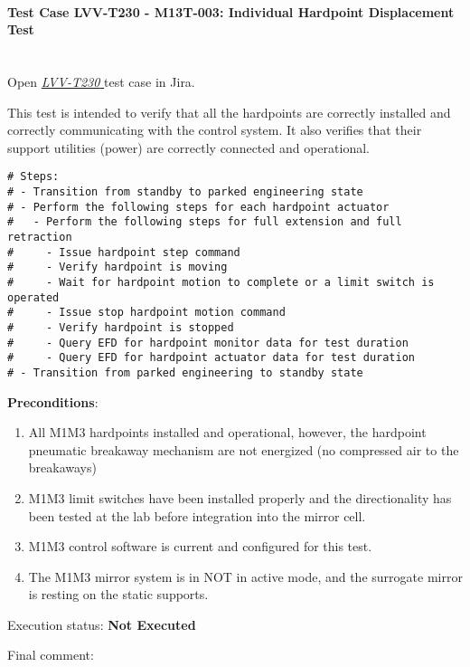 \documentclass[SE,lsstdraft,STR,toc]{lsstdoc}
\providecommand{\tightlist}{
  \setlength{\itemsep}{0pt}\setlength{\parskip}{0pt}}
\begin{document}
\paragraph{Test Case LVV-T230 - M13T-003: Individual Hardpoint Displacement Test }\mbox{}\\

Open  \href{https://jira.lsstcorp.org/secure/Tests.jspa#/testCase/LVV-T230}{\textit{ LVV-T230 } }
test case in Jira.

This test is intended to verify that all the hardpoints are correctly
installed and correctly communicating with the control system. It also
verifies that their support utilities (power) are correctly connected
and operational.\\[2\baselineskip]

\begin{verbatim}
# Steps:
# - Transition from standby to parked engineering state
# - Perform the following steps for each hardpoint actuator
#   - Perform the following steps for full extension and full retraction
#     - Issue hardpoint step command
#     - Verify hardpoint is moving
#     - Wait for hardpoint motion to complete or a limit switch is operated
#     - Issue stop hardpoint motion command
#     - Verify hardpoint is stopped
#     - Query EFD for hardpoint monitor data for test duration
#     - Query EFD for hardpoint actuator data for test duration
# - Transition from parked engineering to standby state
\end{verbatim}

\textbf{ Preconditions}:\\
\begin{enumerate}
\tightlist
\item
  All M1M3 hardpoints installed and operational, however, the hardpoint
  pneumatic breakaway mechanism are not energized (no compressed air to
  the breakaways)
\item
  M1M3 limit switches have been installed properly and the
  directionality has been tested at the lab before integration into the
  mirror cell.
\item
  M1M3 control software is current and configured for this test.
\item
  The M1M3 mirror system is in NOT in active mode, and the surrogate
  mirror is resting on the static supports.
\end{enumerate}

Execution status: {\bf Not Executed }

Final comment:\\
\end{document}

